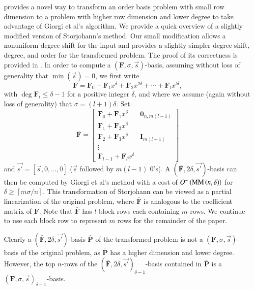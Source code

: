 \citet{Storjohann:2006} provides a novel way to transform an order
basis problem with small row dimension to a problem with higher row
dimension and lower degree to take advantage of Giorgi et al's algorithm.
We provide a quick overview of a slightly modified version of Storjohann's
method. Our small modification allows a nonuniform degree shift for
the input and provides a slightly simpler degree shift, degree, and
order for the transformed problem. The proof of its correctness is
provided in . In order to compute a $\left(\mathbf{F},\sigma,\vec{s}\right)$-basis,
assuming without loss of generality that $\min\left(\vec{s}\right)=0$,
we first write \[
\mathbf{F}=\mathbf{F}_{0}+\mathbf{F}_{1}x^{\delta}+\mathbf{F}_{2}x^{2\delta}+\cdots+\mathbf{F}_{l}x^{l\delta},\]
 with $\deg\mathbf{F}_{i}\le\delta-1$ for a positive integer $\delta$,
and where we assume (again without loss of generality) that $\sigma=\left(l+1\right)\delta$.
Set \[
{\bar{\mathbf{F}}}=\left[\begin{array}{c|c}
\mathbf{F}_{0}+\mathbf{F}_{1}x^{\delta} & \mathbf{0}_{n,m\left(l-1\right)}\\
\hline \mathbf{F}_{1}+\mathbf{F}_{2}x^{\delta}\\
\mathbf{F}_{2}+\mathbf{F}_{3}x^{\delta} & \mathbf{I}_{m\left(l-1\right)}\\
\vdots\\
\mathbf{F}_{l-1}+\mathbf{F}_{l}x^{\delta}\end{array}\right]\]
 and $\vec{s'}=\left[\vec{s},0,\dots,0\right]$ ($\vec{s}$ followed
by $m\left(l-1\right)$ $0$'s). A $({\bar{\mathbf{F}}},2\delta,\vec{s'})$-basis
can then be computed by Giorgi et al's method with a cost of $O^{\sim}\left(\MM\left(n,\delta\right)\right)$
for $\delta\ge\left\lceil m\sigma/n\right\rceil $. This transformation
of Storjohann can be viewed as a partial linearization of the original
problem, where $\bar{\mathbf{F}}$ is analogous to the coefficient
matrix of $\mathbf{F}$. Note that $\bar{\mathbf{F}}$ has $l$ block
rows each containing $m$ rows. We continue to use each block row
to represent $m$ rows for the remainder of the paper.

Clearly a $(\bar{\mathbf{F}},2\delta,\vec{s'})$-basis $\bar{\mathbf{P}}$
of the transformed problem is not a $\left(\mathbf{F},\sigma,\vec{s}\right)$-basis
of the original problem, as $\bar{\mathbf{P}}$ has a higher dimension
and lower degree. However, the top $n$-rows of the $(\bar{\mathbf{F}},2\delta,\vec{s'})_{\delta-1}$-basis
contained in $\bar{\mathbf{P}}$ is a $\left(\mathbf{F},\sigma,\vec{s}\right)_{\delta-1}$-basis.


